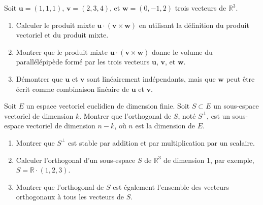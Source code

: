 \begin{exercice}
Soit \( \mathbf{u} = (1, 1, 1) \), \( \mathbf{v} = (2, 3, 4) \), et \( \mathbf{w} = (0, -1, 2) \) trois vecteurs de \( \mathbb{R}^3 \).

\begin{enumerate}
    \item Calculer le produit mixte \( \mathbf{u} \cdot (\mathbf{v} \times \mathbf{w}) \) en utilisant la définition du produit vectoriel et du produit mixte.
    \item Montrer que le produit mixte \( \mathbf{u} \cdot (\mathbf{v} \times \mathbf{w}) \) donne le volume du parallélépipède formé par les trois vecteurs \( \mathbf{u} \), \( \mathbf{v} \), et \( \mathbf{w} \).
    \item Démontrer que \( \mathbf{u} \) et \( \mathbf{v} \) sont linéairement indépendants, mais que \( \mathbf{w} \) peut être écrit comme combinaison linéaire de \( \mathbf{u} \) et \( \mathbf{v} \).
\end{enumerate}
\end{exercice}

\begin{exercice}
Soit \( E \) un espace vectoriel euclidien de dimension finie. Soit \( S \subset E \) un sous-espace vectoriel de dimension \( k \). Montrer que l'orthogonal de \( S \), noté \( S^\perp \), est un sous-espace vectoriel de dimension \( n - k \), où \( n \) est la dimension de \( E \).

\begin{enumerate}
    \item Montrer que \( S^\perp \) est stable par addition et par multiplication par un scalaire.
    \item Calculer l'orthogonal d'un sous-espace \( S \) de \( \mathbb{R}^3 \) de dimension 1, par exemple, \( S = \mathbb{R} \cdot (1, 2, 3) \).
    \item Montrer que l'orthogonal de \( S \) est également l'ensemble des vecteurs orthogonaux à tous les vecteurs de \( S \).
\end{enumerate}
\end{exercice}


